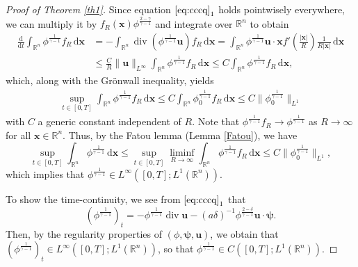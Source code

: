 \documentclass[11pt,reqno]{amsart}
\DeclareMathOperator{\diver}{\mathrm{div}}
\numberwithin{rk}{section}
\numberwithin{prop}{section}
\numberwithin{mydef}{section}
\numberwithin{lem}{section}
\numberwithin{equation}{section}
\numberwithin{thm}{section}
\begin{document}
\begin{proof}[Proof of {\rm Theorem \ref{th1}}]
Since equation $\eqref{eq:cccq}_1$ holds pointwisely everywhere, we can multiply it  by $f_R(\boldsymbol{x})\phi^\frac{2-\gamma}{\gamma-1}$ and integrate over $\mathbb{R}^n$ to obtain
\begin{equation*} 
\begin{aligned}
\frac{\mathrm{d}}{\mathrm{d}t} \int_{\mathbb{R}^n} \phi^\frac{1}{\gamma-1}  f_R\,\mathrm{d}\boldsymbol{x}&=-\int_{\mathbb{R}^n} \diver (\phi^\frac{1}{\gamma-1} \boldsymbol{u})  f_R\,\mathrm{d}\boldsymbol{x}= \int_{\mathbb{R}^n} \phi^\frac{1}{\gamma-1} \boldsymbol{u} \cdot \boldsymbol{x} f' (\frac{|\boldsymbol{x}|}{R}) \frac{1 }{R|\boldsymbol{x}|}\,\mathrm{d}\boldsymbol{x}\\
&\leq \frac{C}{R}\|\boldsymbol{u}\|_{L^\infty} \int_{\mathbb{R}^n}\phi^\frac{1}{\gamma-1}   f_R\,\mathrm{d}\boldsymbol{x}\leq C\int_{\mathbb{R}^n}\phi^\frac{1}{\gamma-1}   f_R\,\mathrm{d}\boldsymbol{x},    
\end{aligned}
\end{equation*}
which,  along with the Gr\"onwall inequality, yields 
\begin{align*}
\sup_{t\in [0,T]}\int_{\mathbb{R}^n} \phi^\frac{1}{\gamma-1}  f_R\,\mathrm{d}\boldsymbol{x}  \leq C \int_{\mathbb{R}^n} \phi^\frac{1}{\gamma-1}_0  f_R\,\mathrm{d}\boldsymbol{x}\leq C\|\phi^\frac{1}{\gamma-1}_0\|_{L^1} 
\end{align*}
with $C$ a generic constant independent of $R$. 
Note that $\phi^\frac{1}{\gamma-1} f_R \to \phi^\frac{1}{\gamma-1}$ as $R\to \infty$ for all $\boldsymbol{x}\in \mathbb{R}^n$. Thus, by the Fatou lemma (Lemma \ref{Fatou}), we have 
\begin{equation*} 
\sup_{t\in [0,T]} \int_{\mathbb{R}^n} \phi^\frac{1}{\gamma-1}\,\mathrm{d}\boldsymbol{x}   \leq \sup_{t\in [0,T]}\liminf_{R \to \infty}\int_{\mathbb{R}^n} \phi^\frac{1}{\gamma-1}  f_R \,\mathrm{d}\boldsymbol{x}  \leq C\|\phi^\frac{1}{\gamma-1}_0\|_{L^1},
\end{equation*}
which implies that $\phi^\frac{1}{\gamma-1}\in L^\infty([0,T];L^1(\mathbb{R}^n))$. 

To show the time-continuity, we see from $\eqref{eq:cccq}_1$ that
\begin{equation*}
(\phi^\frac{1}{\gamma-1})_t=-\phi^\frac{1}{\gamma-1}\diver\boldsymbol{u}-(a
\delta)^{-1}\phi^\frac{2-\delta}{\gamma-1} \boldsymbol{u}\cdot\boldsymbol{\psi}.  
\end{equation*}
Then, by the regularity properties of $(\phi,\boldsymbol{\psi},\boldsymbol{u})$, we obtain that $(\phi^\frac{1}{\gamma-1})_t\in L^\infty([0,T];L^1(\mathbb{R}^n))$, so that $\phi^\frac{1}{\gamma-1}\in C([0,T];L^1(\mathbb{R}^n))$.



\end{proof}
\end{document}

